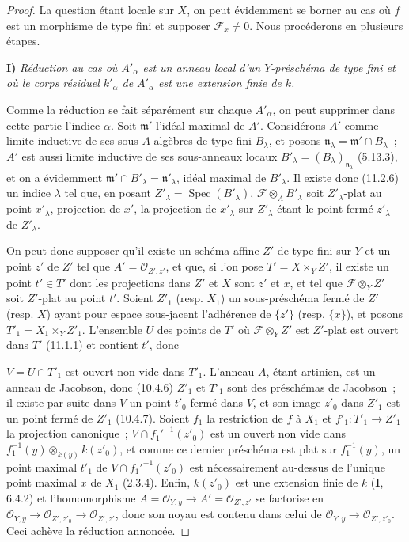 \begin{proof}
La question étant locale sur $X$, on peut évidemment se borner au cas où $f$
est un morphisme de type fini et supposer $\mathcal F_x\neq0$. Nous procéderons
en plusieurs étapes.

\medskip
\noindent\textbf{I)} \emph{Réduction au cas où $A'_\alpha$ est un anneau local
d'un $Y$-préschéma de type fini et où le corps résiduel $k'_\alpha$ de
$A'_\alpha$ est une extension finie de $k$.}

\medskip
Comme la réduction se fait séparément sur chaque $A'_\alpha$, on peut supprimer
dans cette partie l'indice $\alpha$. Soit $\mathfrak m'$ l'idéal maximal de
$A'$. Considérons $A'$ comme limite inductive de ses sous-$A$-algèbres de type
fini $B_\lambda$, et posons $\mathfrak n_\lambda=\mathfrak m'\cap B_\lambda$~;
$A'$ est aussi limite inductive de ses sous-anneaux locaux
$B'_\lambda=(B_\lambda)_{\mathfrak n_\lambda}$ (5.13.3), et on a évidemment
$\mathfrak m'\cap B'_\lambda=\mathfrak n'_\lambda$, idéal maximal de
$B'_\lambda$. Il existe donc (11.2.6) un indice $\lambda$ tel que, en posant
$Z'_\lambda=\operatorname{Spec}(B'_\lambda)$,
$\mathcal F\otimes_A B'_\lambda$ soit $Z'_\lambda$-plat au point $x'_\lambda$,
projection de $x'$, la projection de $x'_\lambda$ sur $Z'_\lambda$ étant le
point fermé $z'_\lambda$ de $Z'_\lambda$.

On peut donc supposer qu'il existe un schéma affine $Z'$ de type fini sur $Y$
et un point $z'$ de $Z'$ tel que $A'=\mathcal O_{Z',z'}$, et que, si l'on pose
$T'=X\times_Y Z'$, il existe un point $t'\in T'$ dont les projections dans
$Z'$ et $X$ sont $z'$ et $x$, et tel que $\mathcal F\otimes_Y Z'$ soit
$Z'$-plat au point $t'$. Soient $Z'_1$ (resp. $X_1$) un sous-préschéma fermé de
$Z'$ (resp. $X$) ayant pour espace sous-jacent l'adhérence de $\{z'\}$ (resp.
$\{x\}$), et posons $T'_1=X_1\times_Y Z'_1$. L'ensemble $U$ des points de
$T'$ où $\mathcal F\otimes_Y Z'$ est $Z'$-plat est ouvert dans $T'$ (11.1.1) et
contient $t'$, donc


$V=U\cap T'_1$ est ouvert non vide dans $T'_1$. L'anneau $A$, étant artinien,
est un anneau de Jacobson, donc (10.4.6) $Z'_1$ et $T'_1$ sont des préschémas de
Jacobson~; il existe par suite dans $V$ un point $t'_0$ fermé dans $V$, et son
image $z'_0$ dans $Z'_1$ est un point fermé de $Z'_1$ (10.4.7). Soient $f_1$ la
restriction de $f$ à $X_1$ et $f'_1:T'_1\to Z'_1$ la projection canonique~;
$V\cap f_1'^{-1}(z'_0)$ est un ouvert non vide dans
$f_1^{-1}(y)\otimes_{k(y)}k(z'_0)$, et comme ce dernier préschéma est plat sur
$f_1^{-1}(y)$, un point maximal $t'_1$ de $V\cap f_1'^{-1}(z'_0)$ est
nécessairement au-dessus de l'unique point maximal $x$ de $X_1$ (2.3.4).
Enfin, $k(z'_0)$ est une extension finie de $k$ (\textbf I, 6.4.2) et
l'homomorphisme $A=\mathcal O_{Y,y}\to A'=\mathcal O_{Z',z'}$ se factorise en
$\mathcal O_{Y,y}\to\mathcal O_{Z',z'_0}\to\mathcal O_{Z',z'}$, donc son noyau
est contenu dans celui de $\mathcal O_{Y,y}\to\mathcal O_{Z',z'_0}$. Ceci
achève la réduction annoncée.


\end{proof}

